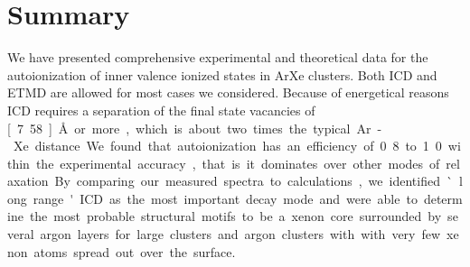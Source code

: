 \section{Summary}
%
We have presented comprehensive experimental and theoretical data for the
autoionization of inner valence ionized states in ArXe clusters.
Both ICD and ETMD are allowed for most cases we considered.
Because of energetical reasons ICD requires a separation of the final state
vacancies of \unit[7.58]{\AA} or more, which is about two times the typical
Ar-Xe distance.
We found that autoionization has an efficiency of 0.8 to 1.0 within the
experimental accuracy, that is it dominates over other modes of relaxation.
By comparing our measured spectra to calculations, we identified `long range'
ICD as the most important decay mode and were able to determine the most
probable structural motifs to be a xenon core surrounded by several argon layers
for large clusters and argon clusters with with very few xenon atoms spread out
over the surface.
